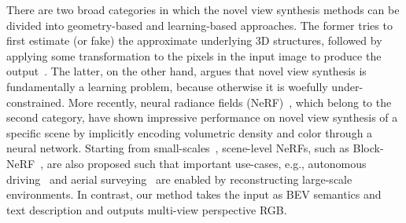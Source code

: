 
 There are two broad categories in which the novel view synthesis methods can be divided into geometry-based and learning-based approaches. The former tries to first estimate (or fake) the approximate underlying 3D structures, followed by applying some transformation to the pixels in the input image to produce the output~\cite{avidan1997novel,zhou2016view}. The latter, on the other hand, argues that novel view synthesis is fundamentally a learning problem, because otherwise it is woefully under-constrained. More recently, neural radiance fields (NeRF)~\cite{mildenhall2021nerf}, which belong to the second category, have shown impressive performance on novel view synthesis of a specific scene by implicitly encoding volumetric density and color through a neural network. Starting from small-scales~\cite{mildenhall2021nerf}, scene-level NeRFs, such as Block-NeRF~\cite{tancik2022block}, are also proposed such that important use-cases, e.g., autonomous driving~\cite{caesar2020nuscenes} and aerial surveying~\cite{kaiser2017learning} are enabled by reconstructing large-scale environments. In contrast, our method takes the input as BEV semantics and text description and outputs multi-view perspective RGB. 

